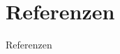 \section{Referenzen}




\begin{frame}{Referenzen}
    \nocite{2021-egg}
    \printbibliography
\end{frame}